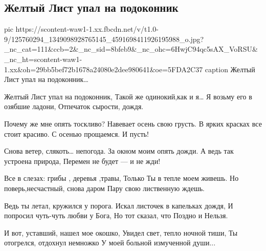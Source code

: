  
 
 

\subsection{Желтый Лист упал на подоконник}
\label{sec:15_11_2020.fb.evgeniy_maslov.1.zheltii_list}

\ifcmt
pic https://scontent-waw1-1.xx.fbcdn.net/v/t1.0-9/125760294_1349098928765145_4591698411926195988_o.jpg?_nc_cat=111&ccb=2&_nc_sid=8bfeb9&_nc_ohc=6HwjC94qc5sAX_VoRSU&_nc_ht=scontent-waw1-1.xx&oh=29bb5bef72b1678a24080e2dee980641&oe=5FDA2C37
caption Желтый Лист упал на подоконник\ldots
\fi

\obeycr
Желтый Лист упал на подоконник,
Такой же одинокий,как и я…
Я возьму его в озябшие ладони,
Отпечаток сырости, дождя.

Почему же мне опять тоскливо?
Навевает осень свою грусть.
В ярких красках все стоит красиво.
С осенью прощаемся. И пусть!

Снова ветер, слякоть… непогода.
За окном моим опять дожди.
А ведь так устроена природа,
Перемен не будет --- и не жди!

Все в слезах: грибы , деревья ,травы,
Только Ты в тепле моем живешь.
Но поверь,несчастный, снова даром
Пару свою лиственную ждешь.

Ведь ты летал, кружился у порога.
Искал листочек в капельках дождя,
И попросил чуть-чуть любви у Бога,
Но тот сказал, что Поздно и Нельзя.

И вот, уставший, нашел мое окошко,
Увидел свет, тепло ночной тиши,
Ты отогрелся, отдохнул немножко
У моей больной измученной души...
\restorecr
